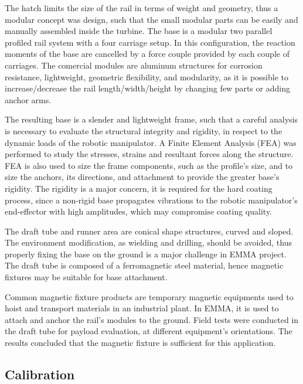 The hatch limits the size of the rail in terms of weight and geometry, thus a
modular concept was design, such that the small modular parts can be easily and
manually assembled inside the turbine. The base is a modular two parallel
profiled rail system %
with a four carriage setup. In this configuration, the reaction moments of the
base are cancelled by a force couple provided by each couple of carriages. The
comercial modules are aluminum structures for corrosion resistance,
lightweight, geometric flexibility, and modularity, as it is possible to
increase/decrease the rail length/width/height by changing few parts or adding
anchor arms. %

The resulting base is a slender and lightweight frame, such that a careful
analysis is necessary to evaluate the structural integrity and rigidity, in
respect to the dynamic loads of the robotic manipulator. A Finite Element
Analysis (FEA) was performed to study the stresses, strains and resultant forces
along the structure. FEA is also used to size the frame components, such as
the profile's size, and to size the anchors, its directions, and attachment to
provide the greater base's rigidity. The rigidity is a major concern, it is
required for the hard coating process, since a non-rigid base propagates
vibrations to the robotic manipulator's end-effector with high amplitudes, which
may compromise coating quality.



The draft tube and runner area are conical shape structures, curved and
sloped. The environment modification, as wielding and drilling, should be
avoided, thus properly fixing the base on the ground is a major challenge in
EMMA project. The draft tube is composed of a ferromagnetic steel material,
hence magnetic fixtures may be suitable for base attachment. 

Common magnetic fixture products are temporary magnetic equipments used to hoist
and transport materials in an industrial plant. In EMMA, it is used to attach
and anchor the rail's modules to the ground. Field tests were conducted in the
draft tube for payload evaluation, at different equipment's orientations. The
results concluded that the magnetic fixture is sufficient for this application.

\subsection{Calibration}
